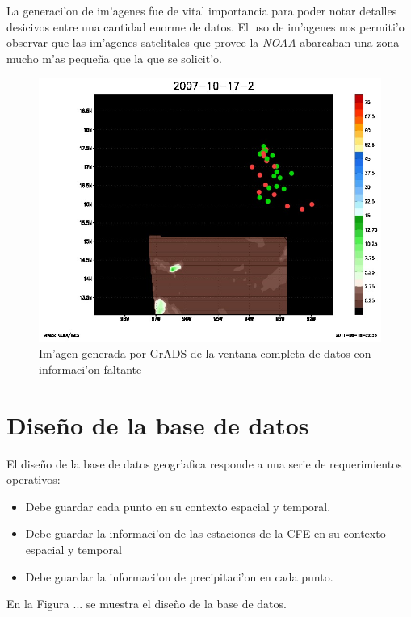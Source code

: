 La generaci'on de im'agenes fue de vital importancia para poder notar detalles desicivos entre una cantidad enorme de datos.
El uso de im'agenes nos permiti'o observar que las im'agenes satelitales que provee la \textit{NOAA} abarcaban una zona mucho
m'as peque\~na que la que se solicit'o.

\begin{figure}[h!]
 \centering
 \includegraphics[width=130mm]{./imagenes/2007_10_17_2.jpg}
 \caption{Im'agen generada por GrADS de la ventana completa de datos con informaci'on faltante}
\end{figure}


\section{Dise\~no de la base de datos}

El dise\~no de la base de datos geogr'afica responde a una serie de requerimientos operativos:
\begin{itemize}
 \item Debe guardar cada punto en su contexto espacial y temporal.
 \item Debe guardar la informaci'on de las estaciones de la CFE en su contexto espacial y temporal
 \item Debe guardar la informaci'on de precipitaci'on en cada punto.
\end{itemize}

En la Figura ... se muestra el diseño de la base de datos.

